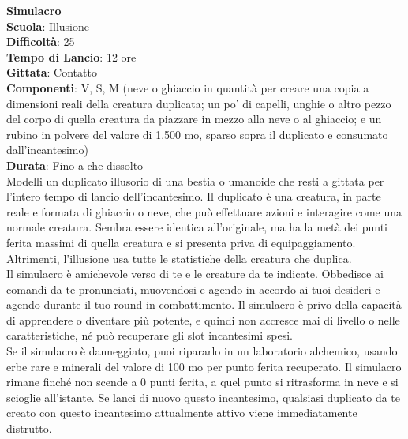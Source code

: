 \begin{multicols}{2}
\medskip\textbf{Simulacro}\\
\textbf{Scuola}: Illusione\\
\textbf{Difficoltà}:  25\\
\textbf{Tempo di Lancio}: 12 ore\\
\textbf{Gittata}: Contatto\\
\textbf{Componenti}: V, S, M (neve o ghiaccio in quantità per creare una copia a dimensioni reali della creatura duplicata; un po’ di capelli, unghie o altro pezzo del corpo di quella creatura da piazzare in mezzo alla neve o al ghiaccio; e un rubino in polvere del valore di 1.500 mo, sparso sopra il duplicato e consumato dall'incantesimo)\\
\textbf{Durata}: Fino a che dissolto\\
Modelli un duplicato illusorio di una bestia o umanoide che resti a gittata per l’intero tempo di  lancio dell'incantesimo. Il duplicato è una creatura, in parte reale e formata di ghiaccio o neve, che può effettuare azioni e interagire come una normale creatura. Sembra essere identica all'originale, ma ha la metà dei punti ferita massimi di quella creatura e si presenta priva di equipaggiamento. Altrimenti, l’illusione usa tutte le statistiche della creatura che duplica.\\
Il simulacro è amichevole verso di te e le creature da te indicate. Obbedisce ai comandi da te pronunciati, muovendosi e agendo in accordo ai tuoi desideri e agendo durante il tuo round in combattimento. Il  simulacro è privo della capacità di apprendere o diventare più potente, e quindi non accresce mai di livello o nelle caratteristiche, né può recuperare gli slot incantesimi spesi.\\
Se il simulacro è danneggiato, puoi ripararlo in un laboratorio alchemico, usando erbe rare e minerali del valore di 100 mo per punto ferita recuperato. Il simulacro rimane finché non scende a 0  punti ferita, a quel punto si ritrasforma in neve e si scioglie all'istante. Se lanci di nuovo questo incantesimo, qualsiasi duplicato da te creato con questo incantesimo attualmente attivo viene immediatamente distrutto.


\end{multicols}
